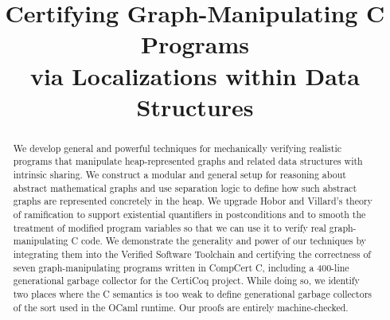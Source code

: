 \documentclass[acmsmall,review,anonymous]{acmart}\settopmatter{printfolios=true,printccs=false,printacmref=false}
\begin{document}
\setlength{\pdfpageheight}{\paperheight}
\setlength{\pdfpagewidth}{\paperwidth}

%
%

\title{Certifying Graph-Manipulating C Programs \\ via Localizations within Data Structures}

\begin{abstract}
We develop general and powerful techniques for mechanically verifying realistic programs that
manipulate heap-represented graphs and related data structures with intrinsic sharing.
We construct a modular and general setup for reasoning about abstract mathematical graphs
and use separation logic to define how such abstract graphs are represented concretely in
the heap.  We upgrade Hobor and Villard's theory of ramification to support existential
quantifiers in postconditions and to smooth the treatment of modified program variables
so that we can use it to verify real graph-manipulating C code.  We demonstrate the generality
and power of our techniques by integrating them into the Verified Software Toolchain and
certifying the correctness of seven graph-manipulating programs written in CompCert C, including
a 400-line generational garbage collector for the CertiCoq project.  While doing so, we identify
two places where the C semantics is too weak to define generational garbage collectors of the
sort used in the OCaml runtime.  Our proofs are entirely machine-checked.
\end{abstract}


\maketitle
\end{document}
